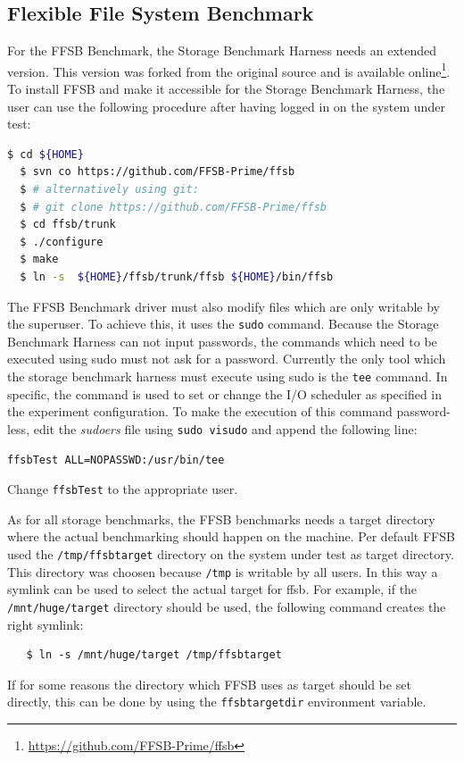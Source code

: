 \subsection{Flexible File System Benchmark}
For the FFSB Benchmark, the Storage Benchmark Harness needs an extended version.
This version was forked from the original source and is available
online\footnote{\url{https://github.com/FFSB-Prime/ffsb}}. To
install FFSB and make it accessible for the Storage Benchmark Harness, the user
can use the following procedure after having logged in on the system under test:
\begin{lstlisting}[language=bash]
  $ cd ${HOME}
  $ svn co https://github.com/FFSB-Prime/ffsb
  $ # alternatively using git:
  $ # git clone https://github.com/FFSB-Prime/ffsb
  $ cd ffsb/trunk
  $ ./configure
  $ make
  $ ln -s  ${HOME}/ffsb/trunk/ffsb ${HOME}/bin/ffsb
\end{lstlisting}
The FFSB Benchmark driver must also modify files which are only writable by the
superuser. To achieve this, it uses the \texttt{sudo} command. Because the
Storage Benchmark Harness can not input passwords, the commands which need to be
executed using sudo must not ask for a password. Currently the only tool which
the storage benchmark harness must execute using sudo is the \texttt{tee}
command. In specific, the command is used to set or change the I/O scheduler as 
specified in the experiment configuration. To make the execution of this command 
password-less, edit the \textit{sudoers} file using \texttt{sudo visudo} and 
append the following line:
\begin{lstlisting}
ffsbTest ALL=NOPASSWD:/usr/bin/tee
\end{lstlisting}
Change \texttt{ffsbTest} to the appropriate user.

As for all storage benchmarks, the FFSB benchmarks needs a target directory
where the actual benchmarking should happen on the machine. Per default FFSB
used the \texttt{/tmp/ffsbtarget} directory on the system under test as target
directory. This directory was choosen because \texttt{/tmp} is writable by all
users. In this way a symlink can be used to select the actual target for ffsb.
For example, if the \texttt{/mnt/huge/target} directory should be used, the
following command creates the right symlink:
\begin{lstlisting}
   $ ln -s /mnt/huge/target /tmp/ffsbtarget
\end{lstlisting}
If for some reasons the directory which FFSB uses as target should be set
directly, this can be done by using the \texttt{ffsbtargetdir} environment
variable. 

